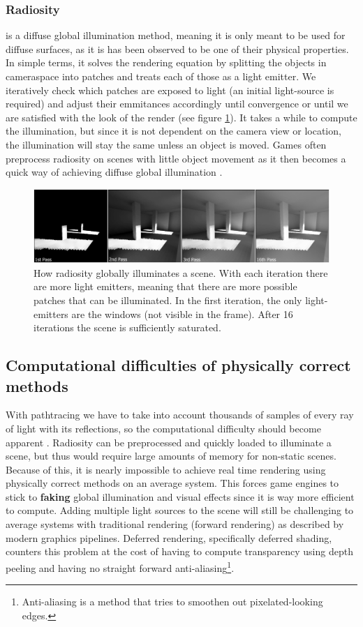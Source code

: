 \documentclass{ACGSeminar}
\begin{document}
	\subsubsection{Radiosity}
		is a diffuse global illumination method, meaning it is only meant to be used for diffuse surfaces, as it is has been observed to be one of their physical properties. In simple terms, it solves the rendering equation by splitting the objects in cameraspace into patches and treats each of those as a light emitter. We iteratively check which patches are exposed to light (an initial light-source is required) and adjust their emmitances accordingly until convergence or until we are satisfied with the look of the render (see figure \ref{fig:radiosity}). It takes a while to compute the illumination, but since it is not dependent on the camera view or location, the illumination will stay the same unless an object is moved. Games often preprocess radiosity on scenes with little object movement as it then becomes a quick way of achieving diffuse global illumination \cite{RAD} \cite{Cohen}.
		\begin{figure}[htb!]%
			\begin{center}%
				\includegraphics[width=16cm]{img/radiosity.png}
			\end{center}%
			\caption{How radiosity globally illuminates a scene. With each iteration there are more light emitters, meaning that there are more possible patches that can be illuminated. In the first iteration, the only light-emitters are the windows (not visible in the frame). After 16 iterations the scene is sufficiently saturated.}%
			\label{fig:radiosity}%
		\end{figure}%
	\subsection{Computational difficulties of physically correct methods}
	With pathtracing we have to take into account thousands of samples of every ray of light with its reflections, so the computational difficulty should become apparent \cite{DST}. Radiosity can be preprocessed and quickly loaded to illuminate a scene, but thus would require large amounts of memory for non-static scenes. Because of this, it is nearly impossible to achieve real time rendering using physically correct methods on an average system. This forces game engines to stick to \textbf{faking} global illumination and visual effects since it is way more efficient to compute. Adding multiple light sources to the scene will still be challenging to average systems with traditional rendering (forward rendering) as described by modern graphics pipelines. Deferred rendering, specifically deferred shading, counters this problem at the cost of having to compute transparency using depth peeling and having no straight forward anti-aliasing\footnote{Anti-aliasing is a method that tries to smoothen out pixelated-looking edges.}.
\end{document}
